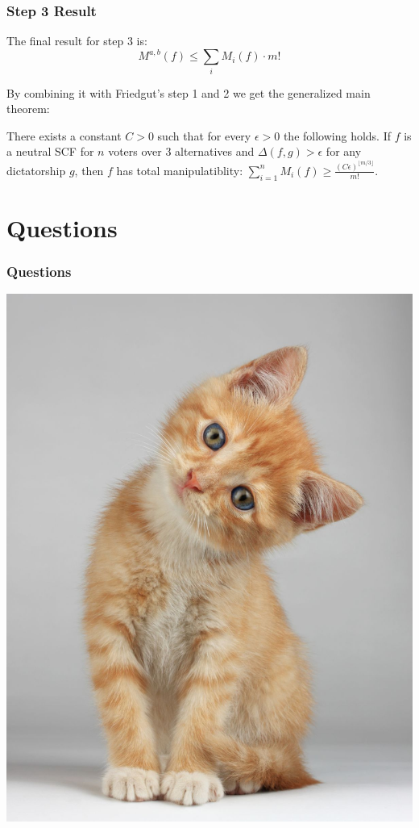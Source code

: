 \documentclass[aspectratio=169]{beamer}
\begin{document}
		\begin{frame}
			\frametitle{Step 3 Result}

			The final result for step 3 is:
			\[
				M^{a,b}(f) \le \sum_i M_i(f) \cdot m!
			\]

			By combining it with Friedgut's step 1 and 2 we get the generalized main theorem:
			\begin{theorem}
				There exists a constant $C > 0$ such that for every $\epsilon > 0$ the following holds. If $f$ is a neutral SCF for $n$ voters over 3 alternatives and $\Delta(f, g) > \epsilon$ for any dictatorship $g$, then $f$ has total manipulatiblity: $\sum^n_{i=1} M_i(f) \ge \frac{(C\epsilon)^{\lfloor m/3 \rfloor}}{m!}$.
			\end{theorem}
		\end{frame}


	\section{Questions}

		\begin{frame}
			\frametitle{Questions}

			\vspace*{-0.12cm}
			\centerline{\includegraphics[height=0.85\paperheight, keepaspectratio]{../figures/question_kitten.jpg}}
		\end{frame}
\end{document}
